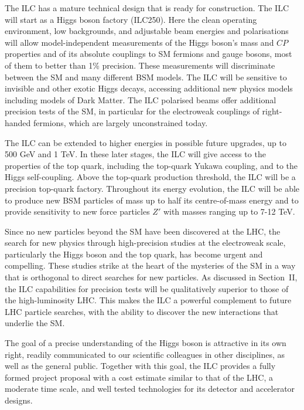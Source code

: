 \documentclass[%
 reprint,
 amsmath,amssymb,
 aps,
]{revtex4-1}
\begin{document}
The ILC has a mature technical design
that is
 ready for construction. The ILC will start as a Higgs boson factory
 (ILC250).  Here the clean operating environment, low backgrounds, and
adjustable beam energies and polarisations will allow
model-independent 
measurements of the Higgs boson's mass and  $CP$ properties and of its
absolute couplings to SM fermions and gauge bosons, 
most of them to better than 1\% precision.  These measurements will
discriminate between the SM and many different BSM models.
The ILC will be sensitive to invisible and other exotic Higgs decays,
accessing additional new physics models including models of Dark
Matter.   The ILC polarised beams offer additional precision tests of
the SM, in particular for the electroweak couplings of right-handed
fermions, 
which are largely unconstrained today.


The ILC can be extended to higher energies in possible future
upgrades, up to 500 GeV and 1 TeV.  In these later stages, 
the ILC will give access to the properties of the top quark,
 including the top-quark Yukawa coupling, and  to the Higgs self-coupling.
Above  the top-quark production threshold,  the ILC will be
 a precision top-quark factory. Throughout its energy evolution,  the
 ILC will be able to produce new BSM particles of mass 
up to half its centre-of-mass energy and to  provide
 sensitivity to new force particles $Z'$ with masses ranging up to 7-12 TeV. 


Since no new particles beyond the SM have been 
discovered at the LHC, the search for new physics through
high-precision studies at the electroweak scale, particularly the Higgs boson and  the top quark, has
become
 urgent and compelling.  These studies strike at the heart of the
 mysteries of the SM in a way that is orthogonal to 
 direct searches for new particles.
 As discussed in Section~II, the ILC capabilities 
for precision tests
will be qualitatively superior  to those of the high-luminosity LHC. 
 This makes the ILC a powerful complement to  future LHC
 particle searches, with the ability to discover the new interactions that underlie the
 SM. 
 
The goal of a precise understanding of the Higgs boson is attractive
in its own right, readily communicated to our scientific
colleagues in other disciplines, as well as the general public.  Together
with this goal, the ILC provides a fully formed project proposal
with a  cost estimate
 similar to that of the LHC, a moderate time scale, and well tested
 technologies for its 
detector and accelerator designs. 
\end{document}
